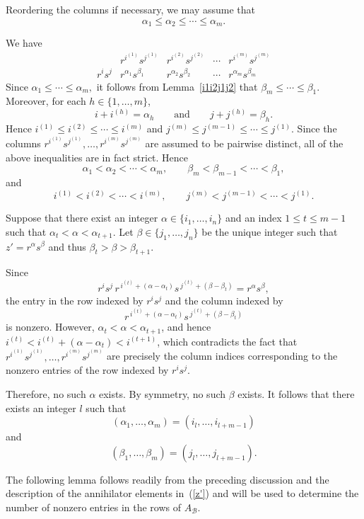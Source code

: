 \documentclass[11pt,reqno]{amsart}
\theoremstyle{plain}
\theoremstyle{remark}
\theoremstyle{definition}
\begin{document}
Reordering the columns if necessary, we may assume that
\[
\alpha_1\leq\alpha_2\leq\cdots\leq\alpha_m.
\]

We have
\[
\begin{array}{c|cccc}
 & r^{i^{(1)}}s^{j^{(1)}} & r^{i^{(2)}}s^{j^{(2)}} & \cdots & r^{i^{(m)}}s^{j^{(m)}} \\ \hline
r^is^j
& r^{\alpha_1}s^{\beta_1}
& r^{\alpha_2}s^{\beta_2}
& \cdots
& r^{\alpha_m}s^{\beta_m}
\end{array}
\]
Since
\(
\alpha_1\leq\cdots\leq\alpha_m,
\)
it follows from Lemma~\ref{i1i2j1j2} that
\(
\beta_m\leq\cdots\leq\beta_1.
\)
Moreover, for each $h\in\{1,\ldots,m\}$,
\[
i+i^{(h)}=\alpha_h
\qquad\text{and}\qquad
j+j^{(h)}=\beta_h.
\]
Hence
\(
i^{(1)}\leq i^{(2)}\leq\cdots\leq i^{(m)}
\)
and
\(
j^{(m)}\leq j^{(m-1)}\leq\cdots\leq j^{(1)}.
\)
Since the columns
\(
r^{i^{(1)}}s^{j^{(1)}},\ldots,r^{i^{(m)}}s^{j^{(m)}}
\)
are assumed to be pairwise distinct, all of the above inequalities are in fact strict. Hence
\[
\alpha_1<\alpha_2<\cdots<\alpha_m,
\qquad
\beta_m<\beta_{m-1}<\cdots<\beta_1,
\]
and
\[
i^{(1)}<i^{(2)}<\cdots<i^{(m)},
\qquad
j^{(m)}<j^{(m-1)}<\cdots<j^{(1)}.
\]

Suppose that there exist an integer \(\alpha\in\{i_1,\ldots,i_n\}\) and an index \(1\leq t\leq m-1\) such that
\(\alpha_t<\alpha<\alpha_{t+1}\).
Let \(\beta\in\{j_1,\ldots,j_n\}\)
be the unique integer such that
\(z'=r^{\alpha}s^{\beta}\) and thus \(\beta_t>\beta>\beta_{t+1}\).

Since
\[r^is^j\,r^{\,i^{(t)}+(\alpha-\alpha_t)}s^{\,j^{(t)}+(\beta-\beta_t)}
=
r^{\alpha}s^{\beta},\]
the entry in the row indexed by $r^is^j$ and the column indexed by
\[
r^{\,i^{(t)}+(\alpha-\alpha_t)}s^{\,j^{(t)}+(\beta-\beta_t)}
\]
is nonzero. However, \(\alpha_t<\alpha<\alpha_{t+1}\), and hence
\(i^{(t)}<i^{(t)}+(\alpha-\alpha_t)<i^{(t+1)}\),
which contradicts the fact that
\(r^{i^{(1)}}s^{j^{(1)}},\ldots,r^{i^{(m)}}s^{j^{(m)}}\)
are precisely the column indices corresponding to the nonzero entries of the row indexed by $r^is^j$.

Therefore, no such $\alpha$ exists. By symmetry, no such $\beta$ exists. 
It follows that there exists an integer $l$ such that
\[
(\alpha_1,\ldots,\alpha_m)
=
(i_l,\ldots,i_{l+m-1})
\]
and
\[
(\beta_1,\ldots,\beta_m)
=
(j_l,\ldots,j_{l+m-1}).
\]

The following lemma follows readily from the preceding discussion and the description of the annihilator elements in~(\ref{z'}) and will be used to determine the number of nonzero entries in the rows of $A_{\mathcal B}$.
\end{document}
